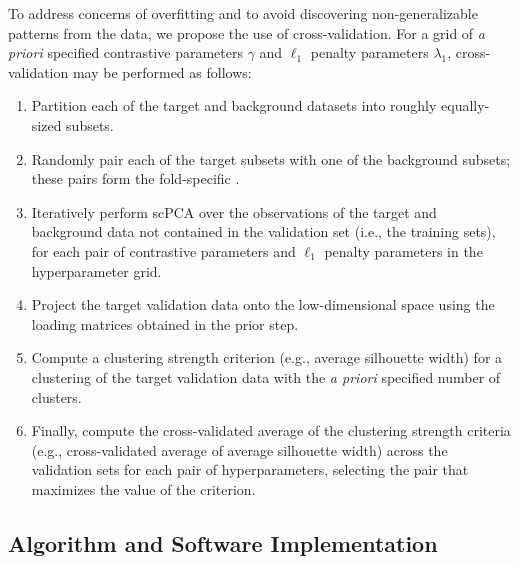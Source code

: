To address concerns of overfitting and to avoid discovering non-generalizable patterns from the data, we propose the use of cross-validation. For a grid of \textit{a priori} specified contrastive parameters $\gamma$ and $\ell_1$ penalty parameters $\lambda_1$,  cross-validation may be performed as follows:
\begin{enumerate}
  \itemsep0pt
  \item Partition each of the target and     
     background datasets into  roughly
     equally-sized subsets.
   \item Randomly pair each of the target  subsets with one of the
     background subsets; these pairs form the fold-specific .
   \item Iteratively perform scPCA over the 
     observations of the target and
     background data not contained in the validation set (i.e., the training sets),
     for each pair of contrastive parameters and $\ell_1$ penalty parameters in
     the hyperparameter grid.
  \item Project the target validation data onto the low-dimensional space using
     the loading matrices obtained in the prior step.
  \item Compute a clustering strength criterion (e.g., average
  silhouette width) for a clustering of the target validation data with the \textit{a priori}
  specified number of clusters.
  \item Finally, compute the cross-validated average of the clustering
  strength criteria (e.g., cross-validated average of average silhouette width)
  across the validation sets for each pair of hyperparameters, selecting the
  pair that maximizes the value of the criterion.
\end{enumerate}


\subsection{Algorithm and Software Implementation}

